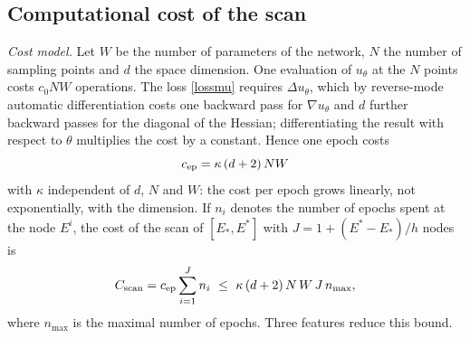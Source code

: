 
\subsection*{Computational cost of the scan}

\emph{Cost model.} Let $W$ be the number of parameters of the network, $N$ the number of
sampling points and $d$ the space dimension. One evaluation of $u_\theta$ at the $N$
points costs $c_0NW$ operations. The loss \eqref{lossmu} requires $\Delta u_\theta$,
which by reverse-mode automatic differentiation costs one backward pass for
$\nabla u_\theta$ and $d$ further backward passes for the diagonal of the Hessian;
differentiating the result with respect to $\theta$ multiplies the cost by a constant.
Hence one epoch costs
\[
c_{\rm ep}=\kappa\,(d+2)\,NW
\]
with $\kappa$ independent of $d$, $N$ and $W$: the cost per epoch grows linearly, not
exponentially, with the dimension. If $n_i$ denotes the number of epochs spent at the node
$E^i$, the cost of the scan of $[E_*,E^*]$ with $J=1+(E^*-E_*)/h$ nodes is
\begin{equation}\label{cost.scan}
C_{\rm scan}=c_{\rm ep}\sum_{i=1}^Jn_i\ \le\ \kappa\,(d+2)\,N\,W\,J\,n_{\max},
\end{equation}
where $n_{\max}$ is the maximal number of epochs. Three features reduce this bound.
